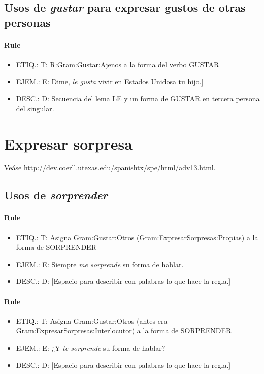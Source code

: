 \documentclass[11pt]{report}
\begin{document}
\subsection{Usos de \emph{gustar} para expresar gustos de otras personas}
\paragraph*{Rule}
\begin{itemize}
\item ETIQ.:  T: R:Gram:Gustar:Ajenos a la forma del verbo GUSTAR
\item EJEM.:  E: Dime, \emph{le gusta} vivir en Estados Unidosa tu hijo.] 
\item DESC.:  D: Secuencia del lema LE y un forma de GUSTAR en tercera persona del singular.
\end{itemize}

\section{Expresar sorpresa}
Veáse \url{http://dev.coerll.utexas.edu/spanishtx/spe/html/adv13.html}.

\subsection{Usos de \emph{sorprender}}
\paragraph*{Rule}
\begin{itemize}
\item ETIQ.:  T: Asigna Gram:Gustar:Otros (Gram:ExpresarSorpresas:Propias) a la forma de SORPRENDER
\item EJEM.:  E: Siempre \emph{me sorprende} su forma de hablar.
\item DESC.:  D: [Espacio para describir con palabras lo que hace la regla.]
\end{itemize}

\paragraph*{Rule}
\begin{itemize}
\item ETIQ.:  T: Asigna Gram:Gustar:Otros (antes era Gram:ExpresarSorpresas:Interlocutor) a la forma de SORPRENDER
\item EJEM.:  E: ¿Y \emph{te sorprende} su forma de hablar?
\item DESC.:  D: [Espacio para describir con palabras lo que hace la regla.]
\end{itemize}
\end{document}
